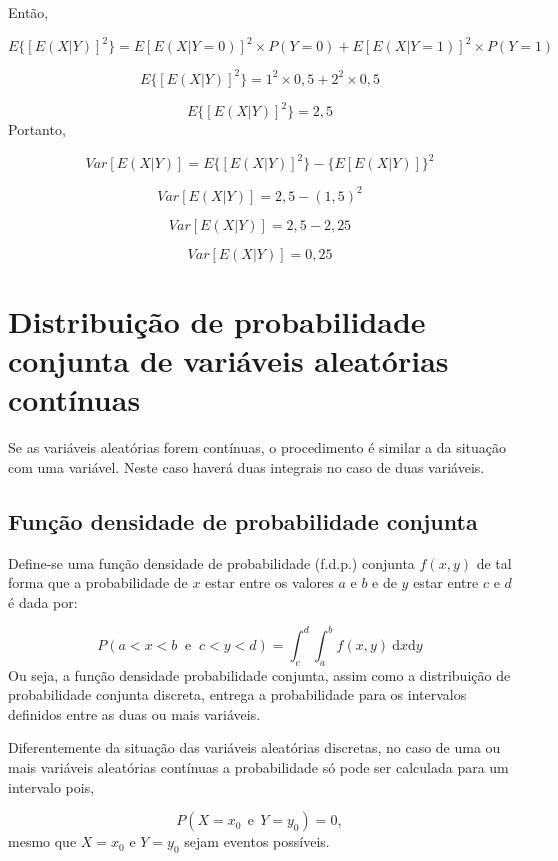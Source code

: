 \documentclass[
]{book}
\begin{document}
Então,

\[
  E\{[E(X|Y)]^2\} = E[E(X|Y=0)]^2\times P(Y=0) + E[E(X|Y=1)]^2\times P(Y=1) 
\]

\[
  E\{[E(X|Y)]^2\} = 1^2\times 0,5 + 2^2\times 0,5 
\]

\[
  E\{[E(X|Y)]^2\} = 2,5 
\]
Portanto,

\[
  Var[E(X|Y)] = E\{[E(X|Y)]^2\} - \{E[E(X|Y)]\}^2 
\]

\[
  Var[E(X|Y)] = 2,5 - (1,5)^2 
\]

\[
  Var[E(X|Y)] = 2,5 - 2,25 
\]

\[
  Var[E(X|Y)] = 0,25
\]

\hypertarget{distribuiuxe7uxe3o-de-probabilidade-conjunta-de-variuxe1veis-aleatuxf3rias-contuxednuas}{%
\section{Distribuição de probabilidade conjunta de variáveis aleatórias contínuas}\label{distribuiuxe7uxe3o-de-probabilidade-conjunta-de-variuxe1veis-aleatuxf3rias-contuxednuas}}

Se as variáveis aleatórias forem contínuas, o procedimento é similar a da situação com uma variável. Neste caso haverá duas integrais no caso de duas variáveis.

\hypertarget{funuxe7uxe3o-densidade-de-probabilidade-conjunta}{%
\subsection{Função densidade de probabilidade conjunta}\label{funuxe7uxe3o-densidade-de-probabilidade-conjunta}}

Define-se uma função densidade de probabilidade (f.d.p.) conjunta \(f(x,y)\) de tal forma que a probabilidade de \(x\) estar entre os valores \(a\) e \(b\) e de \(y\) estar entre \(c\) e \(d\) é dada por:

\[
  P(a < x < b ~\text{ e }~ c < y < d) = \int_{c}^{d}\int_{a}^{b}f(x,y)~\text{d}x \text{d}y
  \label{eq:FdpConjunta}
\]
Ou seja, a função densidade probabilidade conjunta, assim como a distribuição de probabilidade conjunta discreta, entrega a probabilidade para os intervalos definidos entre as duas ou mais variáveis.

Diferentemente da situação das variáveis aleatórias discretas, no caso de uma ou mais variáveis aleatórias contínuas a probabilidade só pode ser calculada para um intervalo pois,

\[
  P(X=x_0~~\text{e}~~Y=y_0) = 0,
\]
mesmo que \(X=x_0\) e \(Y=y_0\) sejam eventos possíveis.
\end{document}
